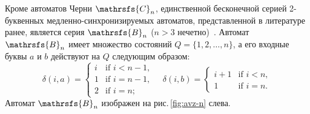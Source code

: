 \documentclass[11pt]{article}
\newcommand{\sa}{synchronizing automata}
\begin{document}
Кроме автоматов Черни $\mathrsfs{C}_n$, единственной бесконечной серией
2-буквенных медленно-синхронизируемых автоматов, 
представленной в литературе ранее, является серия $\mathrsfs{B}_n$ ($n>3$
нечетно)~\cite{AVZ}. Автомат $\mathrsfs{B}_n$ имеет множество состояний 
$Q=\{1,2,\dots,n\}$, а его входные буквы $a$ и $b$ действуют на $Q$ следующим
образом:
$$\delta(i,a)=\begin{cases}
i &\text{if } i<n-1,\\
1 &\text{if } i=n-1,\\
2 &\text{if } i=n;
\end{cases}\quad
\delta(i,b)=\begin{cases}
i+1 &\text{if } i<n,\\
1 &\text{if } i=n.
\end{cases}$$
Автомат $\mathrsfs{B}_n$ изображен на рис.\,\ref{fig:avz-n} слева.


\end{document}
